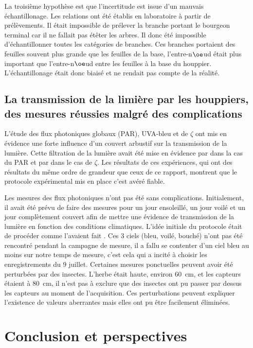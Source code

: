 ﻿\documentclass[12pt]{report}
\begin{document}
La troisième hypothèse est que l'incertitude est issue d'un mauvais
échantillonage. Les relations ont été établis en laboratoire à partir de
prélèvements. Il était impossible de prélever la branche portant le bourgeon
terminal car il ne fallait pas étêter les arbres. Il donc été impossible
d'échantillonner toutes les catégories de branches. Ces branches portaient des
feuilles souvent plus grande que les feuilles de la base, l'entre-n$\oe$ud était
plus important que l'entre-n$\oe$ud entre les feuilles à la base du houppier.
L'échantillonage était donc biaisé et ne rendait pas compte de la réalité.


\section{La transmission de la limière par les houppiers, des mesures réussies
malgré des complications}

L'étude des flux photoniques globaux (PAR), UVA-bleu et de $\zeta$ ont mis en
évidence une forte influence d'un couvert arbustif sur la transmission de la
lumière. Cette filtration de la lumière avait été mise en évidence par
\citet{MAR_ref36} dans la cas du PAR et par \citet{MAR_ref30} dans le cas de
$\zeta$. Les résultats de ces expériences, qui ont des résultats du même ordre
de grandeur que ceux de ce rapport, montrent que le protocole expérimental
mis en place c'est avéré fiable.

Les mesures des flux photoniques n'ont pas été sans complications. Initialement,
il avait été prévu de faire des mesures pour un jour ensoleillé, un jour voilé
et un jour complètement couvert afin de mettre une évidence de transmission de
la lumière en fonction des conditions climatiques. L'idée initiale du protocole
était de procéder comme l'avaient fait \citet{MAR_ref36}. Ces 3 ciels (bleu,
voilé, bouché) n'ont pas été rencontré pendant la campagne de mesure, il a fallu
se contenter d'un ciel bleu au moins sur notre temps de mesure, c'est cela qui a
incité à choisir les enregistrements du 9 juillet. Certaines mesures ponctuelles
peuvent avoir été perturbées par des insectes. L'herbe était haute, environ
60~cm, et les capteurs étaient à 80~cm, il n'est pas à exclure que des insectes
ont pu passer par dessus les capteurs au moment de l'acquisition. Ces
perturbations peuvent expliquer l'existence de valeurs aberrantes mais elles ont
pu être facilement éliminées.


\chapter{Conclusion et perspectives}
\end{document}
